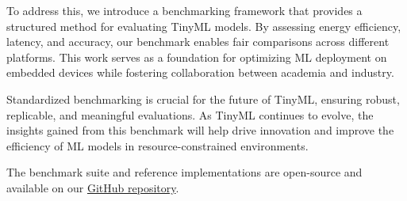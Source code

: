 \documentclass[conference]{IEEEtran}
\begin{document}
To address this, we introduce a benchmarking framework that provides a structured method for evaluating TinyML models. By assessing energy efficiency, latency, and accuracy, our benchmark enables fair comparisons across different platforms. This work serves as a foundation for optimizing ML deployment on embedded devices while fostering collaboration between academia and industry.

Standardized benchmarking is crucial for the future of TinyML, ensuring robust, replicable, and meaningful evaluations. As TinyML continues to evolve, the insights gained from this benchmark will help drive innovation and improve the efficiency of ML models in resource-constrained environments.

The benchmark suite and reference implementations are open-source and available on our {\href{https://github.com/Sharif-University-ESRLab/fall2024-embeddedml-benchmark}{GitHub repository}}.
\end{document}
